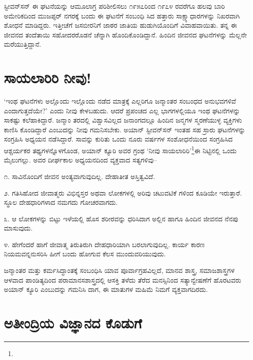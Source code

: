 ಸ್ಟೀವನ್​ಸನ್ ಈ ಘಟನೆಯನ್ನು ಆಮೂಲಾಗ್ರ ಪರಿಶೀಲಿಸಲು ೧೯೫೭ರಿಂದ ೧೯೭೪ ರವರೆಗೂ ಹಲವು ಬಾರಿ ಅಮೇರಿಕದಿಂದ ಮುಜಪ್ಫರ್ ನಗರಕ್ಕೆ ಬಂದು ಈ ಘಟನೆಗೆ ಸಂಬಂಧಿ ಸಿದ ಹತ್ತಾರು ಸಾಕ್ಷ್ಯಾಧಾರಗಳನ್ನು ನಿಖರವಾಗಿ ಶೋಧನೆ ಮಾಡಿದ್ದರು. ಇತ್ತೀಚೆಗೆ ಜಸಬೀರನಿಗೆ ಜಾಠರ ಜಾತಿಯ ಹುಡುಗಿಯೊಂದಿಗೆ ವಿವಾಹವಾಯಿತು. ತನ್ನ ಈ ಜೀವನದ ತಂದೆತಾಯಿ ಸಹೋದರರೊಡನೆ ಚೆನ್ನಾಗಿ ಹೊಂದಿಕೊಂಡಿದ್ದಾನೆ. ಹಿಂದಿನ ಜೀವನದ ಘಟನೆಗಳನ್ನು ಮೆಲ್ಲನೇ ಮರೆಯುತ್ತಿದ್ದಾನೆ.


\section{ಸಾಯಲಾರಿರಿ ನೀವು!}

‘ಇಂಥ ಘಟನೆಗಳು ಅಲ್ಲೊಂದು ಇಲ್ಲೊಂದು ನಡೆದ ಮಾತ್ರಕ್ಕೆ ಎಲ್ಲರಿಗೂ ಜನ್ಮಾಂತರ ಸಂಬಂಧದ ಅನುಭವಗಳಿವೆ ಎಂದಾಗುತ್ತದೆಯೇ?’ ಎಂದು ನೀವು ಕೇಳಬಹುದು. ಆದರೆ ಪ್ರಪಂಚದ ಎಲ್ಲ ಭಾಗಗಳಲ್ಲಿಯೂ ಇಂಥ ಘಟನೆಗಳನ್ನು ಸಾಕಷ್ಟು ಕಲೆಹಾಕಿದ್ದಾರೆ. ಜನ್ಮಾಂ ತರದಲ್ಲಿ ವಿಶ್ವಾಸವಿಲ್ಲದ ಜನಾಂಗದಲ್ಲೂ ಹಿಂದಿನ ಜನ್ಮಗಳ ಸ್ಮರಣೆಯುಳ್ಳ ವ್ಯಕ್ತಿಗಳು ಕಾಣಿಸಿ ಕೊಂಡಿದ್ದಾರೆ ಎಂಬುದನ್ನು ನೀವು ಗಮನಿಸಬೇಕು. ಅಯಾನ್ ಸ್ಟೀವನ್​ಸನ್ ಇಂತಹ ಸಹ ಸ್ರಾರು ಘಟನೆಗಳನ್ನು ಸಂಗ್ರಹಿಸಿ ಅಧ್ಯಯನ ನಡೆಸಿದ್ದಾರೆ. ಸಾವನ್ನು ಕುರಿತು ಒಂದು ನೂರು ವರ್ಷಗಳ ಸಂಶೋಧನೆಯಿಂದ ಸಂಗ್ರಹಿಸಿದ ಆಶ್ಚರ್ಯಕರ ತಥ್ಯಗಳನ್ನೊಳಗೊಂಡ, ಅಯಾನ್ ಕ್ಯೂರಿ ಅವರ ಗ್ರಂಥ ‘ನೀವು ಸಾಯಲಾರಿರಿ’\footnote{}ಈ ನಿಟ್ಟಿನಲ್ಲಿ ಒಂದು ಮೈಲುಗಲ್ಲು. ಅವರ ದೀರ್ಘಕಾಲ ಅಧ್ಯಯನದಿಂದ ವ್ಯಕ್ತವಾದ ಸತ್ಯಗಳಿವು–

೧. ಸಾವಿನೊಂದಿಗೆ ಜೀವನ ಅಂತ್ಯವಾಗುವುದಿಲ್ಲ. ದೇಹಾತೀತ ಅಸ್ತಿತ್ವವಿದೆ.

೨. ಗತಿಸಿಹೋದ ಜೀವಾತ್ಮರು ವಿಭಿನ್ನಸ್ತರ ಅಥವಾ ಲೋಕಗಳಲ್ಲಿ ಅರಿವು ಚಟುವಟಿಕೆ ಗಳಿಂದ ಕೂಡಿಯೇ ಇರುತ್ತಾರೆ. ಸ್ಥೂಲ ದೇಹಧಾರಿಗಳಾದ ನಮಗದು ಗೋಚರವಾಗದು.

೩. ಆ ಲೋಕಗಳನ್ನು ಬಿಟ್ಟು ಇಳೆಯಲ್ಲಿ ಹೊಸ ಶರೀರವನ್ನು ಧರಿಸಿದಾಗ ಅಲ್ಲಿನ ಹಾಗೂ ಹಿಂದಿನ ಜೀವನದ ನೆನಪು ಮಾಸುವುದು.

೪. ಹೇಗೆಂದರೆ ಹಾಗೆ ಜೀವಾತ್ಮ ತಿರುತಿರುಗಿ ದೇಹಧಾರಿಯಾಗಿ ಬರಲಾಗುವುದಿಲ್ಲ. ಕಾರ್ಯ ಕಾರಣ ನಿಯಮವನ್ನನುಸರಿಸಿ ಹೀಗೆ ಬಂದು ಹೋಗುವ ಕೆಲಸ ಮುಂದುವರಿಯುವುದು.

ಜನ್ಮಾಂತರ ಮತ್ತು ಕರ್ಮಸಿದ್ಧಾಂತಕ್ಕೆ ಸಂಬಂಧಿಸಿ ಯಾವ ಪೂರ್ವಾಗ್ರಹವಿಲ್ಲದೆ, ಮಾನವ ಶಾಸ್ತ್ರ, ಸಮಾಜಶಾಸ್ತ್ರಗಳ ಆಳವಾದ ಪಾಂಡಿತ್ಯದಿಂದ ಪರಾಮಾನಸಶಾಸ್ತ್ರದಲ್ಲಿ ಆಸಕ್ತಿ ತಳೆದು ತೆರೆದ ಮನಸ್ಸಿನಿಂದ ಸತ್ಯಾನ್ವೇಷಣೆಗೆ ಹೊರಟವರು ಅಯಾನ್ ಕ್ಯೂರಿ ಎಂಬುದನ್ನು ಗಮನಿಸಿ ದಾಗ, ಈ ಮಾತುಗಳ ಮಹಿಮೆ ನಿಮಗೆ ವ್ಯಕ್ತವಾಗದಿರದು.


\section{ಅತೀಂದ್ರಿಯ ವಿಜ್ಞಾನದ ಕೊಡುಗೆ}

